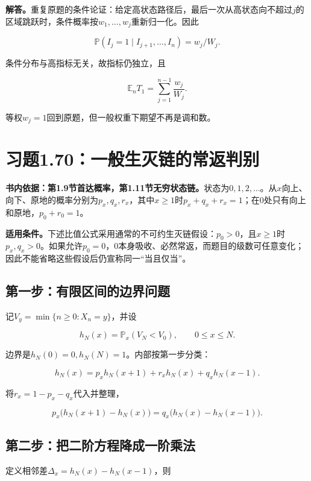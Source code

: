 \documentclass[
  11pt,a4paper,UTF8,fontset=fandol]{ctexart}
\begin{document}
\textbf{解答。}重复原题的条件论证：给定高状态路径后，最后一次从高状态向不超过\(j\)的区域跳跃时，条件概率按\(w_1,\ldots,w_j\)重新归一化。因此

\[\mathbb P(I_j=1\mid I_{j+1},\ldots,I_n)=w_j/W_j.\]

条件分布与高指标无关，故指标仍独立，且

\[\boxed{\mathbb E_nT_1=\sum_{j=1}^{n-1}\frac{w_j}{W_j}.}\]

等权\(w_j=1\)回到原题，但一般权重下期望不再是调和数。

\section{习题1.70：一般生灭链的常返判别}\label{ux4e60ux98981.70ux4e00ux822cux751fux706dux94feux7684ux5e38ux8fd4ux5224ux522b}

\textbf{书内依据：第1.9节首达概率，第1.11节无穷状态链。}状态为\(0,1,2,\ldots\)。从\(x\)向上、向下、原地的概率分别为\(p_x,q_x,r_x\)，其中\(x\ge1\)时\(p_x+q_x+r_x=1\)；在0处只有向上和原地，\(p_0+r_0=1\)。

\textbf{适用条件。}下述比值公式采用通常的不可约生灭链假设：\(p_0>0\)，且\(x\ge1\)时\(p_x,q_x>0\)。如果允许\(p_0=0\)，0本身吸收、必然常返，而题目的级数可任意变化；因此不能省略这些假设后仍宣称同一``当且仅当''。

\subsection{第一步：有限区间的边界问题}\label{ux7b2cux4e00ux6b65ux6709ux9650ux533aux95f4ux7684ux8fb9ux754cux95eeux9898}

记\(V_y=\min\{n\ge0:X_n=y\}\)，并设

\[h_N(x)=\mathbb P_x(V_N<V_0),\qquad0\le x\le N.\]

边界是\(h_N(0)=0,h_N(N)=1\)。内部按第一步分类：

\[h_N(x)=p_xh_N(x+1)+r_xh_N(x)+q_xh_N(x-1).\]

将\(r_x=1-p_x-q_x\)代入并整理，

\[p_x\bigl(h_N(x+1)-h_N(x)\bigr)=q_x\bigl(h_N(x)-h_N(x-1)\bigr).\]

\subsection{第二步：把二阶方程降成一阶乘法}\label{ux7b2cux4e8cux6b65ux628aux4e8cux9636ux65b9ux7a0bux964dux6210ux4e00ux9636ux4e58ux6cd5}

定义相邻差\(\Delta_x=h_N(x)-h_N(x-1)\)，则
\end{document}
